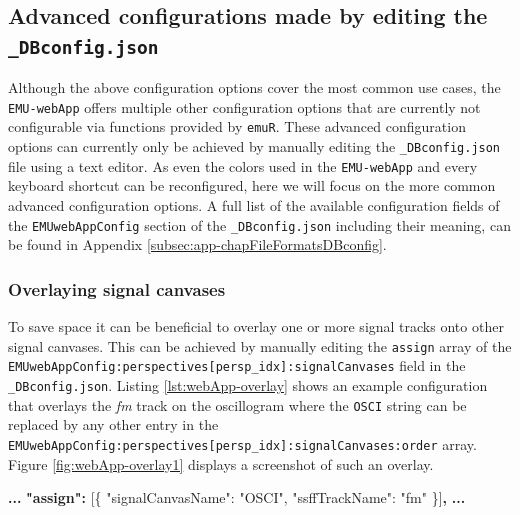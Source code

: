 \documentclass[]{book}
\newenvironment{Shaded}{\begin{snugshade}}{\end{snugshade}}
\newcommand{\DataTypeTok}[1]{\textcolor[rgb]{0.13,0.29,0.53}{#1}}
\newcommand{\ErrorTok}[1]{\textcolor[rgb]{0.64,0.00,0.00}{\textbf{#1}}}
\newcommand{\FunctionTok}[1]{\textcolor[rgb]{0.00,0.00,0.00}{#1}}
\newcommand{\OtherTok}[1]{\textcolor[rgb]{0.56,0.35,0.01}{#1}}
\newcommand{\StringTok}[1]{\textcolor[rgb]{0.31,0.60,0.02}{#1}}
\theoremstyle{definition}
\theoremstyle{definition}
\theoremstyle{definition}
\theoremstyle{remark}
\begin{document}
\hypertarget{subsec:emu-webAppAdvancedConfig}{%
\subsection{\texorpdfstring{Advanced configurations made by editing the
\texttt{\_DBconfig.json}}{Advanced configurations made by editing the \_DBconfig.json}}\label{subsec:emu-webAppAdvancedConfig}}

Although the above configuration options cover the most common use
cases, the \texttt{EMU-webApp} offers multiple other configuration
options that are currently not configurable via functions provided by
\texttt{emuR}. These advanced configuration options can currently only
be achieved by manually editing the \texttt{\_DBconfig.json} file using
a text editor. As even the colors used in the \texttt{EMU-webApp} and
every keyboard shortcut can be reconfigured, here we will focus on the
more common advanced configuration options. A full list of the available
configuration fields of the \texttt{EMUwebAppConfig} section of the
\texttt{\_DBconfig.json} including their meaning, can be found in
Appendix \ref{subsec:app-chapFileFormatsDBconfig}.

\hypertarget{overlaying-signal-canvases}{%
\subsubsection{Overlaying signal
canvases}\label{overlaying-signal-canvases}}

To save space it can be beneficial to overlay one or more signal tracks
onto other signal canvases. This can be achieved by manually editing the
\texttt{assign} array of the
\texttt{EMUwebAppConfig:perspectives{[}persp\_idx{]}:signalCanvases}
field in the \texttt{\_DBconfig.json}. Listing \ref{lst:webApp-overlay}
shows an example configuration that overlays the \emph{fm} track on the
oscillogram where the \texttt{OSCI} string can be replaced by any other
entry in the
\texttt{EMUwebAppConfig:perspectives{[}persp\_idx{]}:signalCanvases:order}
array. Figure \ref{fig:webApp-overlay1} displays a screenshot of such an
overlay.

\begin{Shaded}
\begin{Highlighting}[]
\ErrorTok{...}
\ErrorTok{"assign":} \OtherTok{[}\FunctionTok{\{}
    \DataTypeTok{"signalCanvasName"}\FunctionTok{:} \StringTok{"OSCI"}\FunctionTok{,}
    \DataTypeTok{"ssffTrackName"}\FunctionTok{:} \StringTok{"fm"}
\FunctionTok{\}}\OtherTok{]}\ErrorTok{,}
\ErrorTok{...}
\end{Highlighting}
\end{Shaded}
\end{document}
